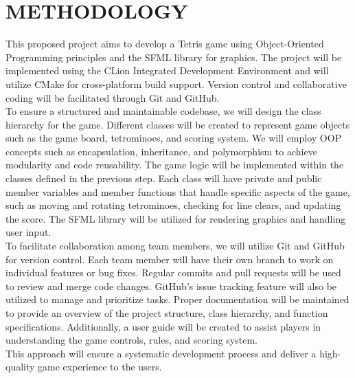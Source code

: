 	\newpage
\section{METHODOLOGY}
\hspace{5mm}This proposed project aims to develop a Tetris game using Object-Oriented Programming principles and the SFML library for graphics. The project will be implemented using the CLion Integrated Development Environment and will utilize CMake for cross-platform build support. Version control and collaborative coding will be facilitated through Git and GitHub.\\

To ensure a structured and maintainable codebase, we will design the class hierarchy for the game. Different classes will be created to represent game objects such as the game board, tetrominoes, and scoring system. We will employ OOP concepts such as encapsulation, inheritance, and polymorphism to achieve modularity and code reusability. The game logic will be implemented within the classes defined in the previous step. Each class will have private and public member variables and member functions that handle specific aspects of the game, such as moving and rotating tetrominoes, checking for line clears, and updating the score. The SFML library will be utilized for rendering graphics and handling user input.\\

To facilitate collaboration among team members, we will utilize Git and GitHub for version control. Each team member will have their own branch to work on individual features or bug fixes. Regular commits and pull requests will be used to review and merge code changes. GitHub's issue tracking feature will also be utilized to manage and prioritize tasks. Proper documentation will be maintained to provide an overview of the project structure, class hierarchy, and function specifications. Additionally, a user guide will be created to assist players in understanding the game controls, rules, and scoring system.\\

This approach will ensure a systematic development process and deliver a high-quality game experience to the users.
